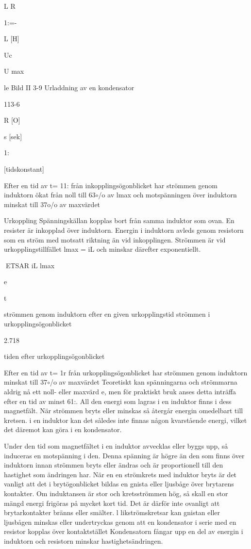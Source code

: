 L
R

1:=-

L [H]

Uc

U max

le
Bild II 3-9 Urladdning av en kondensator

113-6

R [O]

s [sek]

1:

[tidskonstant]

Efter en tid av t= 11: från inkopplingsögonblicket har strömmen genom induktorn
ökat från noll till 63\(\circ\)/o av lmax och motspänningen över induktorn minskat till 37o/o
av maxvärdet

Urkoppling
Spänningskällan kopplas bort från samma
induktor som ovan. En resister är inkopplad
över induktorn. Energin i induktorn avleds
genom resistorn som en ström med motsatt
riktning än vid inkopplingen. Strömmen är
vid urkopplingstillfället lmax = iL och minskar
därefter exponentiellt.

ETSAR
iL
lmax

e

t

strömmen genom induktorn efter en
given urkopplingstid
strömmen i urkopplingsögonblicket

2.718

tiden efter urkopplingsögonblicket

Efter en tid av t= 1r från urkopplingsögonblicket har strömmen genom induktorn
minskat till 37\(\circ\)/o av maxvärdet
Teoretiskt kan spänningarna och strömmarna aldrig nå ett noll- eller maxvärd e, men
för praktiskt bruk anses detta inträffa efter en
tid av minst 61:.
All den energi som lagras i en induktor
finns i dess magnetfält. När strömmen bryts
eller minskas så återgår energin omedelbart
till kretsen. i en induktor kan det således inte
finnas någon kvarstående energi, vilket det
däremot kan göra i en kondensator.

Under den tid som magnetfältet i en induktor avvecklas eller byggs upp, så induceras en motspänning i den. Denna spänning
är högre än den som finns över induktorn
innan strömmen bryts eller ändras och är
proportionell till den hastighet som ändringen har. När en en strömkrets med induktor
bryts är det vanligt att det i brytögonblicket
bildas en gnista eller ljusbåge över brytarens
kontakter.
Om induktansen är stor och kretsströmmen hög, så skall en stor mängd energi
frigöras på mycket kort tid. Det är därför inte
ovanligt att brytarkontakter bränns eller smälter. l likströmskretsar kan gnistan eller ljusbågen minskas eller undertryckas genom att
en kondensator i serie med en resistor kopplas över kontaktstället Kondensatorn fångar
upp en del av energin i induktorn och resistorn minskar hastighetsändringen.

